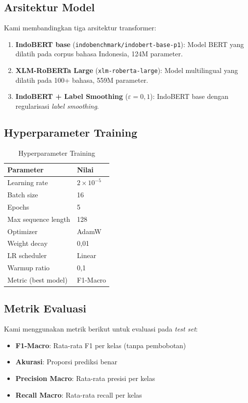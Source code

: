 \documentclass[10pt,twocolumn]{article}
\begin{document}
\subsection{Arsitektur Model}

Kami membandingkan tiga arsitektur transformer:

\begin{enumerate}[leftmargin=*,nosep]
    \item \textbf{IndoBERT base} (\texttt{indobenchmark/indobert-base-p1}): Model BERT yang dilatih pada corpus bahasa Indonesia, 124M parameter.
    \item \textbf{XLM-RoBERTa Large} (\texttt{xlm-roberta-large}): Model multilingual yang dilatih pada 100+ bahasa, 559M parameter.
    \item \textbf{IndoBERT + Label Smoothing} ($\varepsilon=0,1$): IndoBERT base dengan regularisasi \textit{label smoothing}.
\end{enumerate}

\subsection{Hyperparameter Training}

\begin{table}[H]
\centering
\caption{Hyperparameter Training}
\label{tab:hyperparams}
\begin{tabular}{ll}
\toprule
\textbf{Parameter} & \textbf{Nilai} \\
\midrule
Learning rate & $2 \times 10^{-5}$ \\
Batch size & 16 \\
Epochs & 5 \\
Max sequence length & 128 \\
Optimizer & AdamW \\
Weight decay & 0,01 \\
LR scheduler & Linear \\
Warmup ratio & 0,1 \\
Metric (best model) & F1-Macro \\
\bottomrule
\end{tabular}
\end{table}

\subsection{Metrik Evaluasi}

Kami menggunakan metrik berikut untuk evaluasi pada \textit{test set}:
\begin{itemize}[leftmargin=*,nosep]
    \item \textbf{F1-Macro}: Rata-rata F1 per kelas (tanpa pembobotan)
    \item \textbf{Akurasi}: Proporsi prediksi benar
    \item \textbf{Precision Macro}: Rata-rata presisi per kelas
    \item \textbf{Recall Macro}: Rata-rata recall per kelas
\end{itemize}
\end{document}
